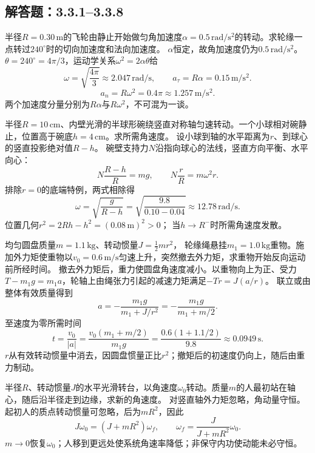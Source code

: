 \subsection{解答题：3.3.1--3.3.8}

\problemtext 半径$R=0.30\,\mathrm m$的飞轮由静止开始做匀角加速度$\alpha=0.5\,\mathrm{rad/s^2}$的转动。求轮缘一点转过$240^\circ$时的切向加速度和法向加速度。
\workings
$\alpha$恒定，故角加速度仍为$0.5\,\mathrm{rad/s^2}$。
$\theta=240^\circ=4\pi/3$，运动学关系$\omega^2=2\alpha\theta$给
\[
\boxed{\omega=\sqrt{\frac{4\pi}{3}}\approx2.047\,\mathrm{rad/s}},
\qquad \boxed{a_\tau=R\alpha=0.15\,\mathrm{m/s^2}}.
\]
\[\boxed{a_n=R\omega^2=0.4\pi\approx1.257\,\mathrm{m/s^2}}.\]
\crosscheck 两个加速度分量分别为$R\alpha$与$R\omega^2$，不可混为一谈。

\problemtext 半径$R=10\,\mathrm{cm}$、内壁光滑的半球形碗绕竖直对称轴匀速转动。一个小球相对碗静止，位置高于碗底$h=4\,\mathrm{cm}$。求所需角速度。
\workings
设小球到轴的水平距离为$r$、到球心的竖直投影绝对值$R-h$。
碗壁支持力$N$沿指向球心的法线，竖直方向平衡、水平向心：
\[
N\frac{R-h}{R}=mg,\qquad N\frac rR=m\omega^2r.
\]
排除$r=0$的底端特例，两式相除得
\[
\boxed{\omega=\sqrt{\frac{g}{R-h}}}
=\sqrt{\frac{9.8}{0.10-0.04}}
\approx12.78\,\mathrm{rad/s}.
\]
\crosscheck 位置几何$r^2=2Rh-h^2=(0.08\,\mathrm m)^2>0$；
当$h\to R^-$时所需角速度发散。

\problemtext 均匀圆盘质量$m=1.1\,\mathrm{kg}$、转动惯量$J=\frac12mr^2$，
轮缘绳悬挂$m_1=1.0\,\mathrm{kg}$重物。施加外力矩使重物以$v_0=0.6\,\mathrm{m/s}$匀速上升，突然撤去外力矩，求重物开始反向运动前所经时间。
\workings
撤去外力矩后，重力使圆盘角速度减小。以重物向上为正、受力$T-m_1g=m_1a$，轮轴上由绳张力引起的减速力矩满足$-Tr=J(a/r)$。
联立或由整体有效质量得到
\[
a=-\frac{m_1g}{m_1+J/r^2}
=-\frac{m_1g}{m_1+m/2}.
\]
至速度为零所需时间
\[
\boxed{t=\frac{v_0}{|a|}
=\frac{v_0(m_1+m/2)}{m_1g}
=\frac{0.6(1+1.1/2)}{9.8}\approx0.0949\,\mathrm s}.
\]
\crosscheck $r$从有效转动惯量中消去，因圆盘惯量正比$r^2$；撤矩后的初速度仍向上，随后由重力制动。

\problemtext 半径$R$、转动惯量$J$的水平光滑转台，以角速度$\omega_0$转动。质量$m$的人最初站在轴心，随后沿半径走到边缘，求新的角速度。
\workings
对竖直轴外力矩忽略，角动量守恒。
起初人的质点转动惯量可忽略，后为$mR^2$，因此
\[
J\omega_0=(J+mR^2)\omega_f,
\qquad \boxed{\omega_f=\frac{J}{J+mR^2}\omega_0}.
\]
\crosscheck $m\to0$恢复$\omega_0$；人移到更远处使系统角速率降低；非保守内功使动能未必守恒。

